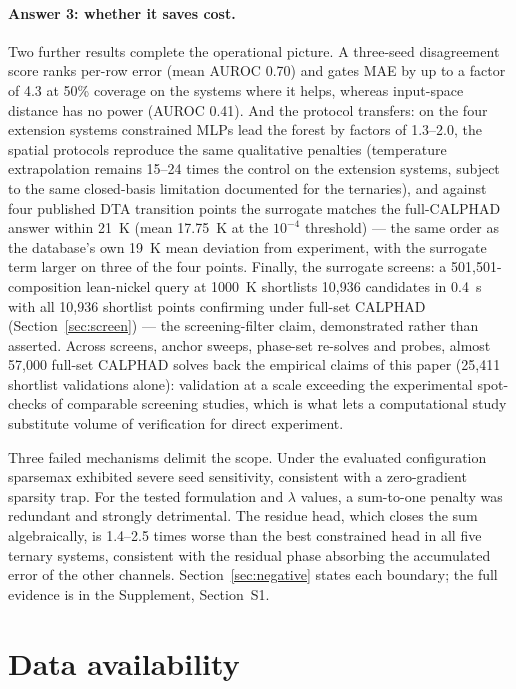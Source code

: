 \documentclass[preprint,12pt,authoryear]{elsarticle}
\begin{document}
\paragraph{Answer 3: whether it saves cost.}
Two further results complete the operational picture. A three-seed
disagreement score ranks per-row error (mean AUROC 0.70) and gates MAE by
up to a factor of 4.3 at 50\% coverage on the systems where it helps,
whereas input-space distance has no power (AUROC 0.41). And the protocol transfers: on the four
extension systems constrained MLPs lead the forest by factors of
1.3--2.0, the spatial protocols reproduce the
same qualitative penalties (temperature extrapolation remains
15--24 times the control on the extension systems, subject to the same
closed-basis limitation documented for the ternaries), and against four
published DTA transition points the
surrogate matches the full-CALPHAD answer within 21~K (mean 17.75~K at the
$10^{-4}$ threshold) --- the same order as the database's own 19~K mean
deviation from experiment, with the surrogate term larger on three of the
four points. Finally, the surrogate screens: a 501{,}501-composition
lean-nickel query at 1000~K shortlists 10{,}936 candidates in 0.4~s with
all 10{,}936 shortlist points confirming under full-set CALPHAD
(Section~\ref{sec:screen}) --- the screening-filter claim, demonstrated
rather than asserted. Across screens, anchor sweeps, phase-set
re-solves and probes, almost 57{,}000 full-set CALPHAD solves back the
empirical claims of this paper (25{,}411 shortlist validations alone):
validation at a scale exceeding the experimental spot-checks of
comparable screening studies, which is what lets a computational study
substitute volume of verification for direct experiment.

Three failed mechanisms delimit the scope. Under the evaluated configuration
sparsemax exhibited severe seed sensitivity, consistent with a
zero-gradient sparsity trap. For the tested formulation and $\lambda$
values, a sum-to-one penalty was redundant and strongly detrimental. The
residue head, which closes the sum algebraically, is 1.4--2.5 times
worse than the best constrained head in all five ternary systems, consistent with the
residual phase absorbing the accumulated error of the other channels.
Section~\ref{sec:negative} states each boundary; the full evidence is in
the Supplement, Section~S1.

\section*{Data availability}
\end{document}
